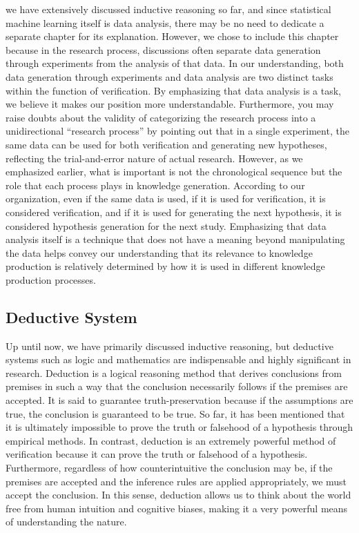 \documentclass{book}
\begin{document}
we have extensively discussed inductive reasoning so far, and since statistical machine learning itself is data analysis, there may be no need to dedicate a separate chapter for its explanation. However, we chose to include this chapter because in the research process, discussions often separate data generation through experiments from the analysis of that data. In our understanding, both data generation through experiments and data analysis are two distinct tasks within the function of verification. By emphasizing that data analysis is a task, we believe it makes our position more understandable. Furthermore, you may raise doubts about the validity of categorizing the research process into a unidirectional ``research process'' by pointing out that in a single experiment, the same data can be used for both verification and generating new hypotheses, reflecting the trial-and-error nature of actual research. However, as we emphasized earlier, what is important is not the chronological sequence but the role that each process plays in knowledge generation. According to our organization, even if the same data is used, if it is used for verification, it is considered verification, and if it is used for generating the next hypothesis, it is considered hypothesis generation for the next study. Emphasizing that data analysis itself is a technique that does not have a meaning beyond manipulating the data helps convey our understanding that its relevance to knowledge production is relatively determined by how it is used in different knowledge production processes.

\subsection{Deductive System}
Up until now, we have primarily discussed inductive reasoning, but deductive systems such as logic and mathematics are indispensable and highly significant in research. Deduction is a logical reasoning method that derives conclusions from premises in such a way that the conclusion necessarily follows if the premises are accepted. It is said to guarantee truth-preservation because if the assumptions are true, the conclusion is guaranteed to be true. So far, it has been mentioned that it is ultimately impossible to prove the truth or falsehood of a hypothesis through empirical methods. In contrast, deduction is an extremely powerful method of verification because it can prove the truth or falsehood of a hypothesis. Furthermore, regardless of how counterintuitive the conclusion may be, if the premises are accepted and the inference rules are applied appropriately, we must accept the conclusion. In this sense, deduction allows us to think about the world free from human intuition and cognitive biases, making it a very powerful means of understanding the nature.
\end{document}
